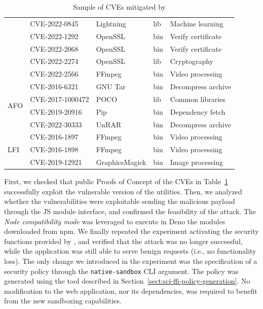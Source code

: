 \begin{table}[!t]
\begin{tabular*}{\columnwidth}{ l l l l l}
							& CVE-2022-0845    & Lightning      & lib & Machine learning    \\
						    & CVE-2022-1292    & OpenSSL        & bin & Verify certificate  \\
						    & CVE-2022-2068    & OpenSSL        & bin & Verify certificate  \\
						    & CVE-2022-2274    & OpenSSL        & lib & Cryptography        \\
						    & CVE-2022-2566    & FFmpeg         & bin & Video processing    \\
	  \midrule
	  \multirow{4}{*}{AFO}  & CVE-2016-6321    & GNU Tar        & bin & Decompress archive  \\
							& CVE-2017-1000472 & POCO           & lib & Common libraries    \\
						    & CVE-2019-20916   & Pip            & bin & Dependency fetch    \\
						    & CVE-2022-30333   & UnRAR          & bin & Decompress archive  \\
	  \midrule
	  \multirow{3}{*}{LFI}  & CVE-2016-1897    & FFmpeg         & bin & Video processing    \\
						    & CVE-2016-1898    & FFmpeg         & bin & Video processing    \\
						    & CVE-2019-12921   & GraphicsMagick & bin & Image processing    \\
	  \bottomrule
	\end{tabular*}
	\caption{\label{table-cve} Sample of CVEs mitigated by \natisand}
\end{table}


First, we checked that public Proofs of Concept of the CVEs in
Table~\ref{table-cve} successfully exploit the vulnerable version of
the utilities. Then, we analyzed whether the vulnerabilities were
exploitable sending the malicious payload through the JS module
interface, and confirmed the feasibility of the attack. The {\em Node
  compatibility mode} was leveraged to execute in Deno the modules
downloaded from npm. We finally repeated the experiment activating the
security functions provided by \natisand, and verified that the attack was
no longer successful, while the application was still able to serve
benign requests (i.e., no functionality loss). The only change we
introduced in the experiment was the specification of a security
policy through the {\tt native-sandbox} CLI argument. The policy was
generated using the tool described in
Section~\ref{sect:sci-ffi-policy-generation}. No modification to the
web application, nor its dependencies, was required to benefit from
the new sandboxing capabilities.


